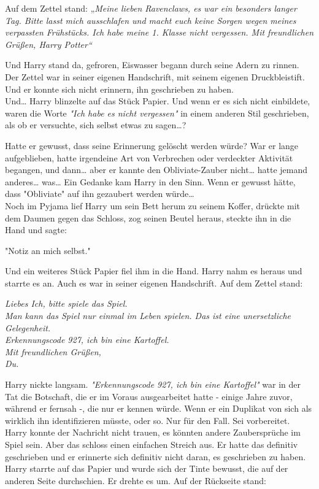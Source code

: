 {Auf dem Zettel stand: „\emph{Meine lieben Ravenclaws, es war ein besonders langer Tag. Bitte lasst mich ausschlafen und macht euch keine Sorgen wegen meines verpassten Frühstücks. Ich habe meine 1. Klasse nicht vergessen. Mit freundlichen Grüßen, Harry Potter“}

Und Harry stand da, gefroren, Eiswasser begann durch seine Adern zu rinnen. Der Zettel war in seiner eigenen Handschrift, mit seinem eigenen Druckbleistift. Und er konnte sich nicht erinnern, ihn geschrieben zu haben.\\ Und… Harry blinzelte auf das Stück Papier. Und wenn er es sich nicht einbildete, waren die Worte \emph{"Ich habe es nicht vergessen"} in einem anderen Stil geschrieben, als ob er versuchte, sich selbst etwas zu sagen…?

Hatte er gewusst, dass seine Erinnerung gelöscht werden würde? War er lange aufgeblieben, hatte irgendeine Art von Verbrechen oder verdeckter Aktivität begangen, und dann… aber er kannte den Obliviate-Zauber nicht… hatte jemand anderes… was… Ein Gedanke kam Harry in den Sinn. Wenn er gewusst hätte, dass "Obliviate" auf ihn gezaubert werden würde…\\ Noch im Pyjama lief Harry um sein Bett herum zu seinem Koffer, drückte mit dem Daumen gegen das Schloss, zog seinen Beutel heraus, steckte ihn in die Hand und sagte:

"Notiz an mich selbst."

Und ein weiteres Stück Papier fiel ihm in die Hand. Harry nahm es heraus und starrte es an. Auch es war in seiner eigenen Handschrift. Auf dem Zettel stand:

\emph{Liebes Ich, bitte spiele das Spiel.}\\ \emph{Man kann das Spiel nur einmal im Leben spielen. Das ist eine unersetzliche Gelegenheit.}\\ \emph{Erkennungscode 927, ich bin eine Kartoffel.}\\ \emph{Mit freundlichen Grüßen,}\\ \emph{Du.}

Harry nickte langsam. \emph{"Erkennungscode 927, ich bin eine Kartoffel"} war in der Tat die Botschaft, die er im Voraus ausgearbeitet hatte - einige Jahre zuvor, während er fernsah -, die nur er kennen würde. Wenn er ein Duplikat von sich als wirklich ihn identifizieren müsste, oder so. Nur für den Fall. Sei vorbereitet. Harry konnte der Nachricht nicht trauen, es könnten andere Zaubersprüche im Spiel sein. Aber das schloss einen einfachen Streich aus. Er hatte das definitiv geschrieben und er erinnerte sich definitiv nicht daran, es geschrieben zu haben. Harry starrte auf das Papier und wurde sich der Tinte bewusst, die auf der anderen Seite durchschien. Er drehte es um. Auf der Rückseite stand:

}
